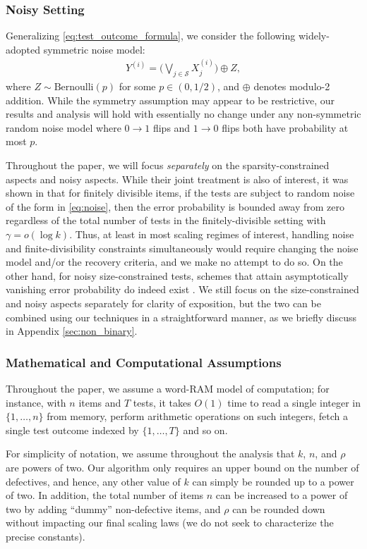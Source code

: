 \subsubsection{Noisy Setting} \label{sec:noise_intro}

Generalizing \eqref{eq:test_outcome_formula}, we consider the following widely-adopted symmetric noise model:
\begin{align}
    Y^{(i)}=\bigg(\bigvee_{j\in\mathcal{S}}X_j^{(i)}\bigg)\oplus Z, \label{eq:noise}
\end{align}
where $Z\sim\text{Bernoulli}(p)$ for some $p\in(0,1/2)$, and $\oplus$ denotes modulo-2 addition. While the symmetry assumption may appear to be restrictive, our results and analysis will hold with essentially no change under any non-symmetric random noise model where $0 \to 1$ flips and $1 \to 0$ flips both have probability at most $p$.

Throughout the paper, we will focus {\em separately} on the sparsity-constrained aspects and noisy aspects.  While their joint treatment is also of interest, it was shown in \cite{Ven19} that for finitely divisible items, if the tests are subject to random noise of the form in \eqref{eq:noise}, then the error probability is bounded away from zero regardless of the total number of tests in the finitely-divisible setting with $\gamma = o(\log k)$.  Thus, at least in most scaling regimes of interest, handling noise and finite-divisibility constraints simultaneously would require changing the noise model and/or the recovery criteria, and we make no attempt to do so. On the other hand, for noisy size-constrained tests, schemes that attain asymptotically vanishing error probability do indeed exist \cite{Ven19}.  We still focus on the size-constrained and noisy aspects separately for clarity of exposition, but the two can be combined using our techniques in a straightforward manner, as we briefly discuss in Appendix \ref{sec:non_binary}.

\subsubsection{Mathematical and Computational Assumptions}
Throughout the paper, we assume a word-RAM model of computation; for instance, with $n$ items and $T$ tests, it takes $O(1)$ time to read a single integer in $\{1,\dots,n\}$ from memory, perform arithmetic operations on such integers, fetch a single test outcome indexed by $\{1,\dots,T\}$ and so on.

For simplicity of notation, we assume throughout the analysis that $k$, $n$, and $\rho$ are powers of two. Our algorithm only requires an upper bound on the number of defectives, and hence, any other value of $k$ can simply be rounded up to a power of two. In addition, the total number of items $n$ can be increased to a power of two by adding ``dummy'' non-defective items, and $\rho$ can be rounded down without impacting our final scaling laws (we do not seek to characterize the precise constants).

